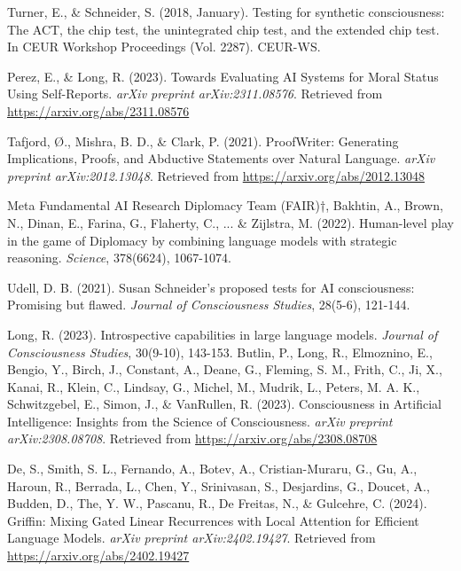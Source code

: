 \documentclass{article}
\begin{document}
\begin{thebibliography}{99}

Turner, E., \& Schneider, S. (2018, January). Testing for synthetic consciousness: The ACT, the chip test, the unintegrated chip test, and the extended chip test. In CEUR Workshop Proceedings (Vol. 2287). CEUR-WS. 

Perez, E., \& Long, R. (2023). Towards Evaluating AI Systems for Moral Status Using Self-Reports. \textit{arXiv preprint arXiv:2311.08576}. Retrieved from \url{https://arxiv.org/abs/2311.08576}

Tafjord, Ø., Mishra, B. D., \& Clark, P. (2021). ProofWriter: Generating Implications, Proofs, and Abductive Statements over Natural Language. \textit{arXiv preprint arXiv:2012.13048}. Retrieved from \url{https://arxiv.org/abs/2012.13048}

Meta Fundamental AI Research Diplomacy Team (FAIR)†, Bakhtin, A., Brown, N., Dinan, E., Farina, G., Flaherty, C., ... \& Zijlstra, M. (2022). Human-level play in the game of Diplomacy by combining language models with strategic reasoning. \textit{Science}, 378(6624), 1067-1074.

Udell, D. B. (2021). Susan Schneider's proposed tests for AI consciousness: Promising but flawed. \textit{Journal of Consciousness Studies}, 28(5-6), 121-144.

Long, R. (2023). Introspective capabilities in large language models. \textit{Journal of Consciousness Studies}, 30(9-10), 143-153.
Butlin, P., Long, R., Elmoznino, E., Bengio, Y., Birch, J., Constant, A., Deane, G., Fleming, S. M., Frith, C., Ji, X., Kanai, R., Klein, C., Lindsay, G., Michel, M., Mudrik, L., Peters, M. A. K., Schwitzgebel, E., Simon, J., \& VanRullen, R. (2023). Consciousness in Artificial Intelligence: Insights from the Science of Consciousness. \textit{arXiv preprint arXiv:2308.08708}. Retrieved from \url{https://arxiv.org/abs/2308.08708}

De, S., Smith, S. L., Fernando, A., Botev, A., Cristian-Muraru, G., Gu, A., Haroun, R., Berrada, L., Chen, Y., Srinivasan, S., Desjardins, G., Doucet, A., Budden, D., The, Y. W., Pascanu, R., De Freitas, N., \& Gulcehre, C. (2024). Griffin: Mixing Gated Linear Recurrences with Local Attention for Efficient Language Models. \textit{arXiv preprint arXiv:2402.19427}. Retrieved from \url{https://arxiv.org/abs/2402.19427}

\end{thebibliography}
\end{document}
